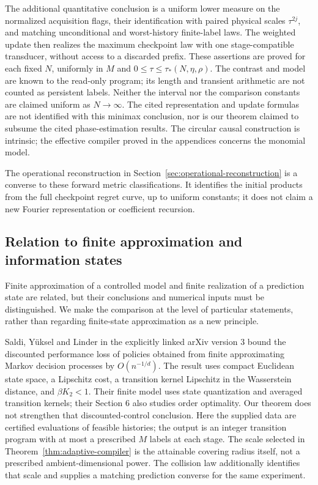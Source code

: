 The additional quantitative conclusion is a uniform lower measure on
the normalized acquisition flags, their identification with paired
physical scales $\tau^{2j}$, and matching unconditional and worst-history
finite-label laws. The weighted update then realizes the maximum
checkpoint law with one stage-compatible transducer, without access
to a discarded prefix. These assertions are proved for each fixed
$N$, uniformly in $M$ and $0\le\tau\le\tau_*(N,\eta,\rho)$.
The contrast and model are known to the read-only program; its length
and transient arithmetic are not counted as persistent labels.
Neither the interval nor the comparison constants are claimed uniform
as $N\to\infty$. The cited representation and update formulas are
not identified with this minimax conclusion, nor is our theorem claimed
to subsume the cited phase-estimation results. The circular causal
construction is intrinsic; the effective compiler proved in the
appendices concerns the monomial model.

The operational reconstruction in
Section~\ref{sec:operational-reconstruction} is a converse to these
forward metric classifications. It identifies the initial products
from the full checkpoint regret curve, up to uniform constants; it
does not claim a new Fourier representation or coefficient recursion.


\subsection{Relation to finite approximation and information states}
Finite approximation of a controlled model and finite realization of a
prediction state are related, but their conclusions and numerical inputs
must be distinguished. We make the comparison at the level of particular
statements, rather than regarding finite-state approximation as a new
principle.

Saldi, Y\"uksel and Linder \cite[Theorem 5.2]{SaldiYukselLinder}
in the explicitly linked arXiv version 3
bound the discounted performance loss of policies obtained from finite
approximating Markov decision processes by $O(n^{-1/d})$. The result
uses compact Euclidean state space, a Lipschitz cost, a transition kernel
Lipschitz in the Wasserstein distance, and $\beta K_2<1$. Their finite
model uses state quantization and averaged transition kernels; their
Section 6 also studies order optimality. Our theorem does not strengthen
that discounted-control conclusion. Here the supplied data are certified
evaluations of feasible histories; the output is an integer transition
program with at most a prescribed $M$ labels at each stage. The scale
selected in Theorem~\ref{thm:adaptive-compiler} is the attainable
covering radius itself, not a prescribed ambient-dimensional power.
The collision law additionally identifies that scale and supplies a
matching prediction converse for the same experiment.

